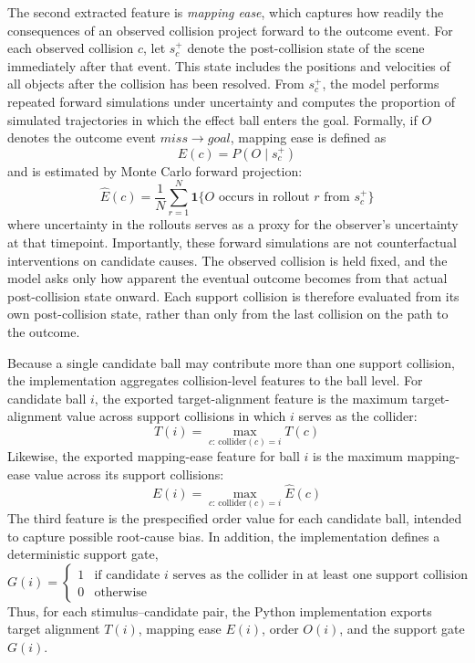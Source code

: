 \documentclass[10pt,letterpaper]{article}
\begin{document}
The second extracted feature is \textit{mapping ease}, which captures how readily the consequences of an observed collision project forward to the outcome event. For each observed collision $c$, let $s_c^+$ denote the post-collision state of the scene immediately after that event. This state includes the positions and velocities of all objects after the collision has been resolved. From $s_c^+$, the model performs repeated forward simulations under uncertainty and computes the proportion of simulated trajectories in which the effect ball enters the goal. Formally, if $O$ denotes the outcome event $miss \rightarrow goal$, mapping ease is defined as
\[
E(c) = P(O \mid s_c^+)
\]
and is estimated by Monte Carlo forward projection:
\[
\hat{E}(c) = \frac{1}{N}\sum_{r=1}^{N} \mathbf{1}\{O \text{ occurs in rollout } r \text{ from } s_c^+\}
\]
where uncertainty in the rollouts serves as a proxy for the observer's uncertainty at that timepoint. Importantly, these forward simulations are not counterfactual interventions on candidate causes. The observed collision is held fixed, and the model asks only how apparent the eventual outcome becomes from that actual post-collision state onward. Each support collision is therefore evaluated from its own post-collision state, rather than only from the last collision on the path to the outcome.

Because a single candidate ball may contribute more than one support collision, the implementation aggregates collision-level features to the ball level. For candidate ball $i$, the exported target-alignment feature is the maximum target-alignment value across support collisions in which $i$ serves as the collider:
\[
T(i) = \max_{c:\,\mathrm{collider}(c)=i} T(c)
\]
Likewise, the exported mapping-ease feature for ball $i$ is the maximum mapping-ease value across its support collisions:
\[
E(i) = \max_{c:\,\mathrm{collider}(c)=i} \hat{E}(c)
\]
The third feature is the prespecified order value for each candidate ball, intended to capture possible root-cause bias. In addition, the implementation defines a deterministic support gate,
\[
G(i) =
\begin{cases}
1 & \text{if candidate } i \text{ serves as the collider in at least one support collision} \\
0 & \text{otherwise}
\end{cases}
\]
Thus, for each stimulus--candidate pair, the Python implementation exports target alignment $T(i)$, mapping ease $E(i)$, order $O(i)$, and the support gate $G(i)$.
\end{document}
